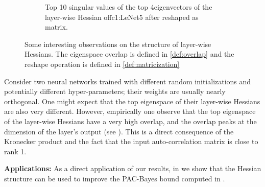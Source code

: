\begin{figure}[th]
\begin{subfigure}[b]{0.38\textwidth}
        \caption{Top 10 singular values of the top 4\linebreak eigenvectors of the layer-wise Hessian of\linebreak fc1:LeNet5 after reshaped as matrix.}
        \label{fig:intro_lowrank}
    \end{subfigure}%
    \caption{Some interesting observations on the structure of layer-wise Hessians.  The eigenspace overlap is defined in \cref{def:overlap} and the reshape operation is defined in \cref{def:matricization}}
    \label{fig:intro_figs}
    \vspace{-6pt}
\end{figure}
Consider two neural networks trained with different random initializations and potentially different hyper-parameters; their weights are usually nearly orthogonal. One might expect that the top eigenspace of their layer-wise Hessians are also very different. However, empirically one observe that the top eigenspace of the layer-wise Hessians have a very high overlap, and the overlap peaks at the dimension of the layer's output (see ). This is a direct consequence of the Kronecker product and the fact that the input auto-correlation matrix is close to rank 1.






\textbf{Applications:} As a direct application of our results, in  we show that the Hessian structure can be used to improve the PAC-Bayes bound computed in \citet{dziugaite2017computing}. %

